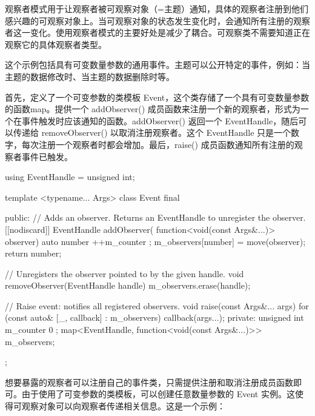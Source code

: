 
观察者模式用于让观察者被可观察对象（=主题）通知，具体的观察者注册到他们感兴趣的可观察对象上。当可观察对象的状态发生变化时，会通知所有注册的观察者这一变化。使用观察者模式的主要好处是减少了耦合。可观察类不需要知道正在观察它的具体观察者类型。


这个示例包括具有可变数量参数的通用事件。主题可以公开特定的事件，例如：当主题的数据修改时、当主题的数据删除时等。


首先，定义了一个可变参数的类模板 Event，这个类存储了一个具有可变数量参数的函数map。提供一个 addObserver() 成员函数来注册一个新的观察者，形式为一个在事件触发时应该通知的函数。addObserver() 返回一个 EventHandle，随后可以传递给 removeObserver() 以取消注册观察者。这个 EventHandle 只是一个数字，每次注册一个观察者时都会增加。最后，raise() 成员函数通知所有注册的观察者事件已触发。

\begin{cpp}
using EventHandle = unsigned int;

template <typename... Args>
class Event final
{
    public:
        // Adds an observer. Returns an EventHandle to unregister the observer.
        [[nodiscard]] EventHandle addObserver(
        function<void(const Args&...)> observer)
        {
            auto number { ++m_counter };
            m_observers[number] = move(observer);
            return number;
        }

        // Unregisters the observer pointed to by the given handle.
        void removeObserver(EventHandle handle)
        {
            m_observers.erase(handle);
        }

        // Raise event: notifies all registered observers.
        void raise(const Args&... args)
        {
            for (const auto& [_, callback] : m_observers) { callback(args...); }
        }
    private:
        unsigned int m_counter { 0 };
        map<EventHandle, function<void(const Args&...)>> m_observers;
};
\end{cpp}

想要暴露的观察者可以注册自己的事件类，只需提供注册和取消注册成员函数即可。由于使用了可变参数的类模板，可以创建任意数量参数的 Event 实例。这使得可观察对象可以向观察者传递相关信息。这是一个示例：

